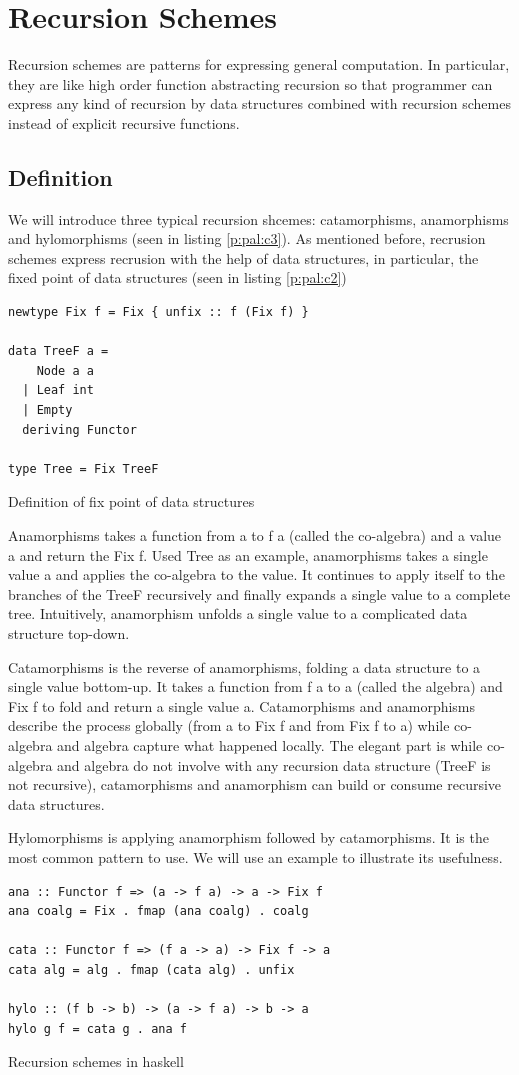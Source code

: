\section{Recursion Schemes} \label{b:rs}
Recursion schemes are patterns for expressing general computation. In particular, they are like high order function abstracting recursion so that programmer can express any kind of recursion by data structures combined with recursion schemes instead of explicit recursive functions.
\subsection{Definition}
We will introduce three typical recursion shcemes: catamorphisms, anamorphisms and hylomorphisms (seen in listing \ref{p:pal:c3}). As mentioned before, recrusion schemes express recrusion with the help of data structures, in particular, the fixed point of data structures (seen in listing \ref{p:pal:c2})
\begin{code}
\begin{verbatim}
newtype Fix f = Fix { unfix :: f (Fix f) }

data TreeF a =
    Node a a
  | Leaf int
  | Empty
  deriving Functor

type Tree = Fix TreeF
\end{verbatim}
\caption{Definition of fix point of data structures} \label{p:pal:c2}
\end{code}

Anamorphisms takes a function from a to f a (called the co-algebra) and a value a and return the Fix f. Used Tree as an example, anamorphisms takes a single value a and applies the co-algebra to the value. It continues to apply itself to the branches of the TreeF recursively and finally expands a single value to a complete tree. Intuitively, anamorphism unfolds a single value to a complicated data structure top-down.

Catamorphisms is the reverse of anamorphisms, folding a data structure to a single value bottom-up. It takes a function from f a to a (called the algebra) and Fix f to fold and return a single value a. Catamorphisms and anamorphisms describe the process globally (from a to Fix f and from Fix f to a) while co-algebra and algebra capture what happened locally. The elegant part is while co-algebra and algebra do not involve with any recursion data structure (TreeF is not recursive), catamorphisms and anamorphism can build or consume recursive data structures.

Hylomorphisms is applying anamorphism followed by catamorphisms. It is the most common pattern to use. We will use an example to illustrate its usefulness. 
\begin{code}
\begin{verbatim}
ana :: Functor f => (a -> f a) -> a -> Fix f
ana coalg = Fix . fmap (ana coalg) . coalg

cata :: Functor f => (f a -> a) -> Fix f -> a
cata alg = alg . fmap (cata alg) . unfix

hylo :: (f b -> b) -> (a -> f a) -> b -> a 
hylo g f = cata g . ana f 
\end{verbatim}
\caption{Recursion schemes in haskell} \label{p:pal:c3}
\end{code}


